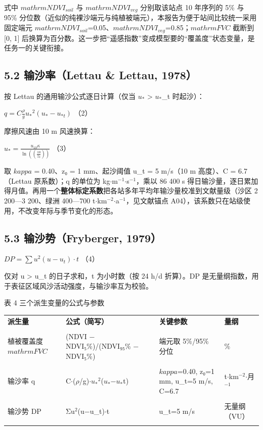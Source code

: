 \documentclass[11pt,a4paper]{ctexart}
\begin{document}
式中 $mathrm{NDVI}_{soil}$ 与 $mathrm{NDVI}_{veg}$ 分别取该站点 10 年序列的 5\% 与 95\% 分位数（近似的纯裸沙端元与纯植被端元），本报告为便于站间比较统一采用固定端元 $mathrm{NDVI}_{soil}$=0.05、$mathrm{NDVI}_{veg}$=0.85；$mathrmFVC$ 截断到 [0, 1] 后换算为百分数。这一步把“遥感指数”变成模型要的“覆盖度”状态变量，是任务一的关键衔接。


\subsection*{5.2 输沙率（Lettau \& Lettau, 1978）}
按 Lettau 的通用输沙公式逐日计算（仅当 $u_{*}$ > $u_{*}$\_t 时起沙）：

$q=C\frac{{\rho}}{g}{u_{*}}^{2}\left(u_{*}-u_{*t}\right)$  （2）

摩擦风速由 10 m 风速换算：

$u_{*}=\frac{u_{10}{\kappa}}{\ln\left(\left(\frac{10}{z_{0}}\right)\right)}$  （3）

取 $kappa$ = 0.40、z₀ = 1 mm、起沙阈值 u\_t = 5 m/s（10 m 高度）、C = 6.7（Lettau 原系数）；q 的单位为 kg$\cdot$m$^{-1}$$\cdot$s$^{-1}$，乘以 86 400 s 得日输沙量，逐日累加得月值。再用一个\textbf{整体标定系数}把各站多年平均年输沙量校准到文献量级（沙区 2 200—3 200、绿洲 400—700 t$\cdot$km$^{-2}$$\cdot$a$^{-1}$，见文献锚点 A04），该系数只在站级使用，不改变年际与季节变化的形态。


\subsection*{5.3 输沙势（Fryberger, 1979）}
$DP={\sum}u^{2}\left(u-u_{t}\right){\cdot}t$  （4）

仅对 u > u\_t 的日子求和，t 为小时数（按 24 h/d 折算）。DP 是无量纲指数，用于表征区域风沙活动强度，与输沙率互为校验。

表 4  三个派生变量的公式与参数


\begin{table}[H]\centering\small\setlength{\parskip}{2pt}
\begin{tabularx}{\textwidth}{|X|X|X|X|}
\toprule
\textbf{派生量} & \textbf{公式（简写）} & \textbf{关键参数} & \textbf{量纲} \\\\
\midrule
植被覆盖度 $mathrmFVC$ & (NDVI − NDVI₅\%)/(NDVI₉₅\% − NDVI₅\%) & 端元取 5\%/95\% 分位 & \% \\\\
输沙率 q & C$\cdot$(${\rho}$/g)$\cdot$$u_{*}$$^{2}$($u_{*}$−$u_{*}$t) & $kappa$=0.40, z₀=1 mm, u\_t=5 m/s, C=6.7 & t$\cdot$km$^{-2}$$\cdot$月$^{-1}$ \\\\
输沙势 DP & Σu$^{2}$(u−u\_t)$\cdot$t & u\_t=5 m/s & 无量纲（VU） \\\\
\bottomrule
\end{tabularx}
\end{table}
\end{document}
